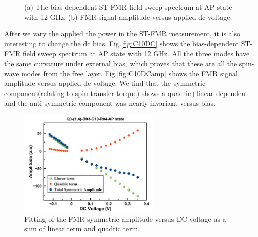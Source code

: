 \begin{figure}[!ht]
\centering
{}
\caption{(a) The bias-dependent ST-FMR field sweep spectrum at AP state with 12 GHz. (b) FMR signal amplitude versus applied dc voltage. }
\end{figure}

After we vary the applied the power in the ST-FMR measurement, it is also interesting to change the dc bias. Fig.\ref{fig:C10DC} shows the bias-dependent ST-FMR field sweep spectrum at AP state with 12 GHz. All the three modes have the same curvature under external bias, which proves that these are all the spin-wave modes from the free layer. Fig.\ref{fig:C10DCamp} shows the FMR signal amplitude versus applied dc voltage. We find that the symmetric component(relating to spin transfer torque) shows a quadric+linear dependent and the anti-symmetric component was nearly invariant versus bias.

\begin{figure}[!ht]
  \centering
  \includegraphics[width=0.6\textwidth]{fig/2018/C10DCFIT}
   \caption{Fitting of the FMR symmetric amplitude versus DC voltage as a sum of linear term and quadric term.}
  \label{fig:C10DCfit}
\end{figure}


